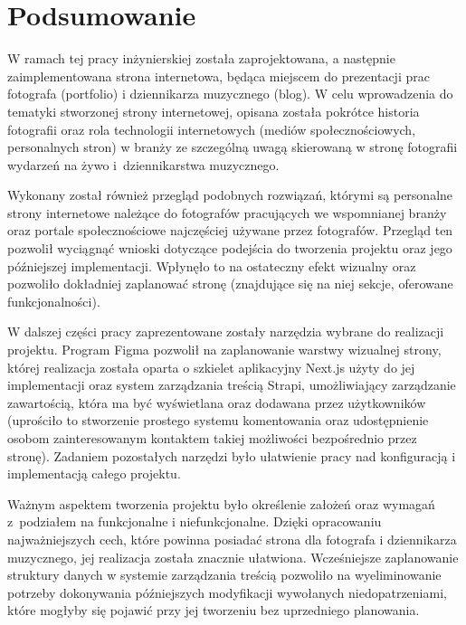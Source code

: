 \documentclass[a4paper, 12pt, twoside]{article}
\numberwithin{figure}{section}
\begin{document}
\begin{sloppypar}

\newpage 

\section{Podsumowanie}

W ramach tej pracy inżynierskiej została zaprojektowana, a następnie zaimplementowana strona internetowa, będąca miejscem do prezentacji prac fotografa (portfolio) i dziennikarza muzycznego (blog). W celu wprowadzenia do tematyki stworzonej strony internetowej, opisana została pokrótce historia fotografii oraz rola technologii internetowych (mediów społecznościowych, personalnych stron) w branży ze szczególną uwagą skierowaną w stronę fotografii wydarzeń na żywo i~dziennikarstwa muzycznego. 

Wykonany został również przegląd podobnych rozwiązań, którymi są personalne strony internetowe należące do fotografów pracujących we wspomnianej branży oraz portale społecznościowe najczęściej używane przez fotografów. Przegląd ten pozwolił wyciągnąć wnioski dotyczące podejścia do tworzenia projektu oraz jego późniejszej implementacji. Wpłynęło to na ostateczny efekt wizualny oraz pozwoliło dokładniej zaplanować stronę (znajdujące się na niej sekcje, oferowane funkcjonalności). 

W dalszej części pracy zaprezentowane zostały narzędzia wybrane do realizacji projektu.  Program Figma pozwolił na zaplanowanie warstwy wizualnej strony, której realizacja została oparta o szkielet aplikacyjny Next.js użyty do jej implementacji oraz system zarządzania treścią Strapi, umożliwiający zarządzanie zawartością, która ma być wyświetlana oraz dodawana przez użytkowników (uprościło to stworzenie prostego systemu komentowania oraz udostępnienie osobom zainteresowanym kontaktem takiej możliwości bezpośrednio przez stronę). Zadaniem pozostałych narzędzi było ułatwienie pracy nad konfiguracją i implementacją całego projektu.

Ważnym aspektem tworzenia projektu było określenie założeń oraz wymagań z~podziałem na funkcjonalne i niefunkcjonalne. Dzięki opracowaniu najważniejszych cech, które powinna posiadać strona dla fotografa i dziennikarza muzycznego, jej realizacja została znacznie ułatwiona. Wcześniejsze zaplanowanie struktury danych w systemie zarządzania treścią pozwoliło na wyeliminowanie potrzeby dokonywania późniejszych modyfikacji wywołanych niedopatrzeniami, które mogłyby się pojawić przy jej tworzeniu bez uprzedniego planowania.


\end{sloppypar}
\end{document}
